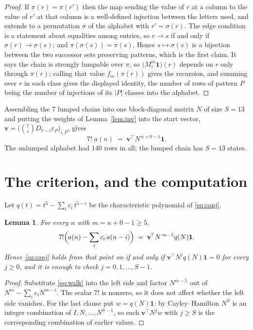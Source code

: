 \documentclass[11pt,a4paper]{article}
\theoremstyle{plain}
\newtheorem{lemma}[theorem]{Lemma}
\theoremstyle{definition}
\begin{document}
\begin{proof}
If $\pi(r)=\pi(r')$ then the map sending the value of $r$ at a column to the value of $r'$
at that column is a well-defined injection between the letters used, and extends to a
permutation $\sigma$ of the alphabet with $r'=\sigma(r)$. The edge condition is a statement
about equalities among entries, so $r\to s$ if and only if $\sigma(r)\to\sigma(s)$; and
$\pi(\sigma(s))=\pi(s)$. Hence $s\mapsto\sigma(s)$ is a bijection between the two successor
sets preserving patterns, which is the first claim. It says the chain is strongly lumpable
over $\pi$, so $\bigl(M_i^{m}\mathbf{1}\bigr)(r)$ depends on $r$ only through $\pi(r)$;
calling that value $f_m(\pi(r))$ gives the recursion, and summing over $r$ in each class
gives the displayed identity, the number of rows of pattern $P$ being the number of
injections of its $|P|$ classes into the alphabet.
\end{proof}

Assembling the $7$ lumped chains into one block-diagonal matrix $N$ of size $S=13$ and
putting the weights of Lemma~\ref{lem:inv} into the start vector,
$\mathbf{v}=\bigl(\binom{7}{i}D_{7-i}\varepsilon_P\bigr)_{i,P}$, gives
\begin{equation}\label{eq:walk}
7!\;a(n)\;=\;\mathbf{v}^{\!\top}N^{\,n+0-1}\mathbf{1} .
\end{equation}
The unlumped alphabet had $140$ rows in all; the lumped chain has $S=13$ states.

\section{The criterion, and the computation}

Let $q(t)=t^{5}-\sum_i c_i\,t^{5-i}$ be the characteristic polynomial of
\eqref{eq:conj}.

\begin{lemma}\label{lem:crit}
For every $n$ with $m=n+0-1\ge5$,
\[
7!\Bigl(a(n)-\sum_i c_i\,a(n-i)\Bigr)\;=\;\mathbf{v}^{\!\top}N^{\,m-5}q(N)\mathbf{1} .
\]
Hence \eqref{eq:conj} holds from that point on if and only if
$\mathbf{v}^{\!\top}N^{j}q(N)\mathbf{1}=0$ for every $j\ge0$, and it is enough to check
$j=0,1,\dots,S-1$.
\end{lemma}

\begin{proof}
Substitute \eqref{eq:walk} into the left side and factor $N^{m-5}$ out of
$N^{m}-\sum_i c_iN^{m-i}$. The scalar $7!$ is nonzero, so it does not affect whether
the left side vanishes. For the last clause put $w=q(N)\mathbf{1}$: by Cayley--Hamilton
$N^{S}$ is an integer combination of $I,N,\dots,N^{S-1}$, so each
$\mathbf{v}^{\!\top}N^{j}w$ with $j\ge S$ is the corresponding combination of earlier
values.
\end{proof}
\end{document}
